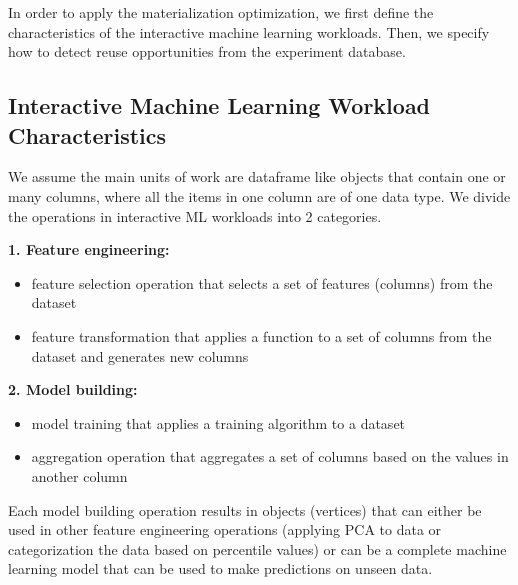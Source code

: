 In order to apply the materialization optimization, we first define the characteristics of the interactive machine learning workloads.
Then, we specify how to detect reuse opportunities from the experiment database.

\subsection{Interactive Machine Learning Workload Characteristics}
We assume the main units of work are dataframe like objects that contain one or many columns, where all the items in one column are of one data type.
We divide the operations in interactive ML workloads into 2 categories.

\textbf{1. Feature engineering:}
\begin{itemize}
\item feature selection operation that selects a set of features (columns) from the dataset
\item feature transformation that applies a function to a set of columns from the dataset and generates new columns
\end{itemize}


\textbf{2. Model building: }
\begin{itemize}
\item model training that applies a training algorithm to a dataset
\item aggregation operation that aggregates a set of columns based on the values in another column
\end{itemize}
Each model building operation results in objects (vertices) that can either be used in other feature engineering operations (applying PCA to data or categorization the data based on percentile values) or can be a complete machine learning model that can be used to make predictions on unseen data.


